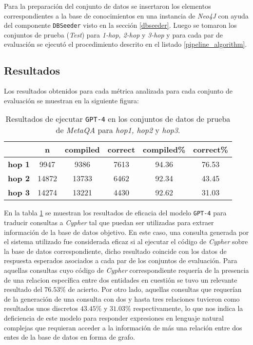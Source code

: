Para la preparación del conjunto de datos se insertaron los elementos correspondientes a la base de conocimientos en una instancia de \textit{Neo4J} con ayuda del componente \texttt{DBSeeder} visto en la sección \ref{dbseeder}. Luego se tomaron los conjuntos de prueba (\textit{Test}) para \textit{1-hop, 2-hop} y \textit{3-hop} y para cada par de evaluación se ejecutó el procedimiento descrito en el listado \ref{pipeline_algorithm}.

\subsection{Resultados}

Los resultados obtenidos para cada métrica analizada para cada conjunto de evaluación se muestran en la siguiente figura:

\begin{table}[H]
\centering
\begin{tabular}{|c|c|c|c|c|c|}
\hline
 & \textbf{n} & \textbf{compiled} & \textbf{correct} & \textbf{compiled\%} & \textbf{correct\%} \\ \hline
\textbf{hop 1} & 9947 & 9386  & 7613 & 94.36 & 76.53  \\ \hline
\textbf{hop 2} & 14872 & 13733  & 6462 & 92.34  & 43.45  \\ \hline
\textbf{hop 3} & 14274 & 13221  & 4430 & 92.62 & 31.03  \\ \hline
\end{tabular}
\caption{Resultados de ejecutar \texttt{GPT-4} en los conjuntos de datos de prueba de \textit{MetaQA} para \textit{hop1, hop2} y \textit{hop3}.}
\label{tab:results1}
\end{table}

En la tabla \ref{tab:results1} se muestran los resultados de eficacia del modelo \texttt{GPT-4} para traducir consultas a \textit{Cypher} tal que puedan ser utilizadas para extraer información de la base de datos objetivo. En este caso, una consulta generada por el sistema utilizado fue considerada eficaz si al ejecutar el código de \textit{Cypher} sobre la base de datos correspondiente, dicho resultado coincide con los datos de respuesta esperados asociados a cada par de los conjuntos de evaluación. Para aquellas consultas cuyo código de \textit{Cypher} correspondiente requería de la presencia de una relacion específica entre dos entidades en cuestión se tuvo un relevante resultado del $76.53\%$ de acierto. Por otro lado, aquellas consultas que requerían de la generación de una consulta con dos y hasta tres relaciones tuvieron como resultados unos discretos $43.45\%$ y $31.03\%$ respectivamente, lo que nos indica la deficiencia de este modelo para responder expresiones en lenguaje natural complejas que requieran acceder a la información de más una relación entre dos entes de la base de datos en forma de grafo.

